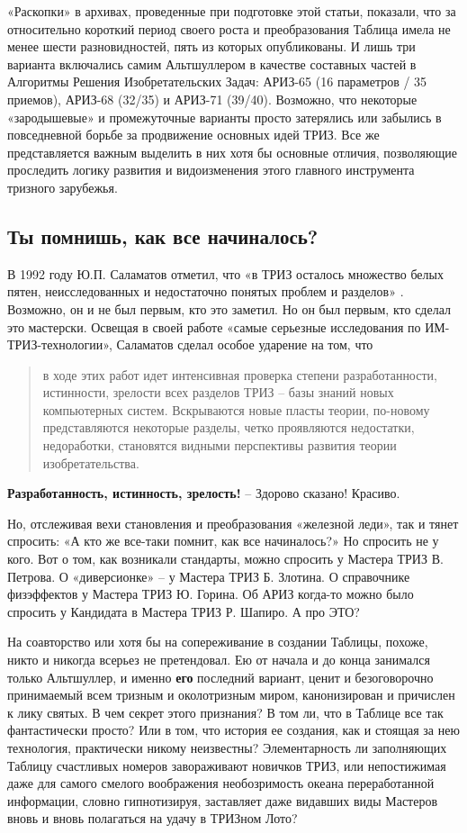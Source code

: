 \documentclass[11pt,a4paper]{article}
\begin{document}
«Раскопки» в архивах, проведенные при подготовке этой статьи, показали, что за
относительно короткий период своего роста и преобразования Таблица имела не
менее шести разновидностей, пять из которых опубликованы. И лишь три варианта
включались самим Альтшуллером в качестве составных частей в Алгоритмы Решения
Изобретательских Задач: АРИЗ-65 (16 параметров / 35 приемов), АРИЗ-68 (32/35)
и АРИЗ-71 (39/40). Возможно, что некоторые «зародышевые» и промежуточные
варианты просто затерялись или забылись в повседневной борьбе за продвижение
основных идей ТРИЗ. Все же представляется важным выделить в них хотя бы
основные отличия, позволяющие проследить логику развития и видоизменения этого
главного инструмента тризного зарубежья.

\subsection*{Ты помнишь, как все начиналось?}

В 1992 году Ю.П. Саламатов отметил, что «в ТРИЗ осталось множество белых
пятен, неисследованных и недостаточно понятых проблем и разделов»
\cite{Salamatov1992}. Возможно, он и не был первым, кто это заметил. Но он был
первым, кто сделал это мастерски. Освещая в своей работе «самые серьезные
исследования по ИМ-ТРИЗ-технологии», Саламатов сделал особое ударение на том,
что 
\begin{quote}
  в ходе этих работ идет интенсивная проверка степени разработанности,
  истинности, зрелости всех разделов ТРИЗ -- базы знаний новых компьютерных
  систем. Вскрываются новые пласты теории, по-новому представляются некоторые
  разделы, четко проявляются недостатки, недоработки, становятся видными
  перспективы развития теории изобретательства.
\end{quote}
\textbf{Разработанность, истинность, зрелость!} -- Здорово сказано!  Красиво.

Но, отслеживая вехи становления и преобразования «железной леди», так и тянет
спросить: «А кто же все-таки помнит, как все начиналось?» Но спросить не у
кого. Вот о том, как возникали стандарты, можно спросить у Мастера ТРИЗ
В. Петрова. О «диверсионке» -- у Мастера ТРИЗ Б. Злотина. О справочнике
физэффектов у Мастера ТРИЗ Ю. Горина. Об АРИЗ когда-то можно было спросить у
Кандидата в Мастера ТРИЗ Р. Шапиро. А про ЭТО?

На соавторство или хотя бы на сопереживание в создании Таблицы, похоже, никто
и никогда всерьез не претендовал. Ею от начала и до конца занимался только
Альтшуллер, и именно \textbf{его} последний вариант, ценит и безоговорочно
принимаемый всем тризным и околотризным миром, канонизирован и причислен к
лику святых. В чем секрет этого признания? В том ли, что в Таблице все так
фантастически просто? Или в том, что история ее создания, как и стоящая за нею
технология, практически никому неизвестны? Элементарность ли заполняющих
Таблицу счастливых номеров завораживают новичков ТРИЗ, или непостижимая даже
для самого смелого воображения необозримость океана переработанной информации,
словно гипнотизируя, заставляет даже видавших виды Мастеров вновь и вновь
полагаться на удачу в ТРИЗном Лото?
\end{document}
